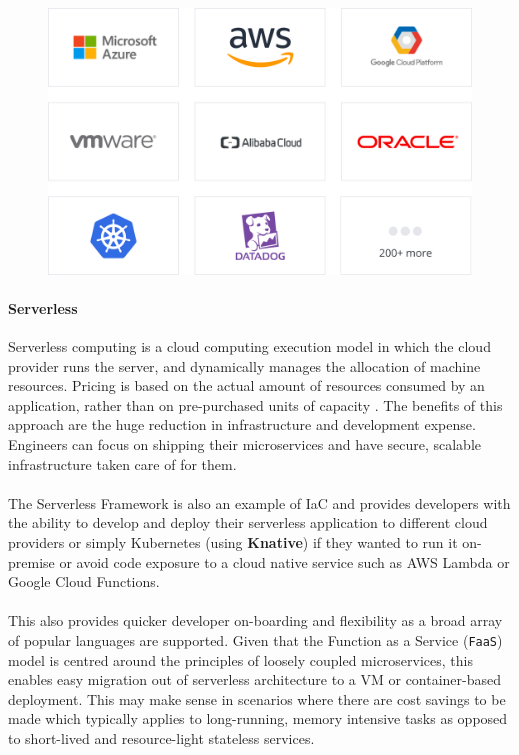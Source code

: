 \documentclass[10pt]{article}
\begin{document}
\begin{figure}[h!]
	\centering
	\includegraphics[width=0.55\linewidth]{images/TerraformProviders.png}	
\end{figure}

\paragraph{Serverless}
Serverless computing is a cloud computing execution model in which the cloud provider runs the server, and dynamically manages the allocation of machine resources. Pricing is based on the actual amount of resources consumed by an application, rather than on pre-purchased units of capacity \cite{serverless}. The benefits of this approach are the huge reduction in infrastructure and development expense. Engineers can focus on shipping their microservices and have secure, scalable infrastructure taken care of for them.
\\ \\
The Serverless Framework is also an example of IaC and provides developers with the ability to develop and deploy their serverless application to different cloud providers or simply Kubernetes (using \textbf{Knative}) if they wanted to run it on-premise or avoid code exposure to a cloud native service such as AWS Lambda or Google Cloud Functions.
\\ \\
This also provides quicker developer on-boarding and flexibility as a broad array of popular languages are supported. Given that the Function as a Service (\texttt{FaaS}) model is centred around the principles of loosely coupled microservices, this enables easy migration out of serverless architecture to a VM or container-based deployment. This may make sense in scenarios where there are cost savings to be made which typically applies to long-running, memory intensive tasks as opposed to short-lived and resource-light stateless services.
\end{document}
